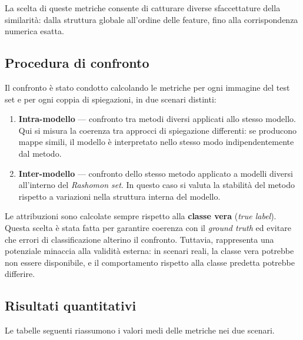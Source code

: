 \documentclass{article}
\begin{document}
La scelta di queste metriche consente di catturare diverse sfaccettature della
similarità: dalla struttura globale all’ordine delle feature, fino alla
corrispondenza numerica esatta.

\subsection{Procedura di confronto}
Il confronto è stato condotto calcolando le metriche per ogni immagine del test
set e per ogni coppia di spiegazioni, in due scenari distinti:

\begin{enumerate}
      \item \textbf{Intra-modello} — confronto tra metodi diversi applicati allo stesso modello. Qui si misura la coerenza tra approcci di spiegazione differenti: se producono mappe simili, il modello è interpretato nello stesso modo indipendentemente dal metodo.
      \item \textbf{Inter-modello} — confronto dello stesso metodo applicato a modelli diversi all’interno del \emph{Rashomon set}. In questo caso si valuta la stabilità del metodo rispetto a variazioni nella struttura interna del modello.
\end{enumerate}

Le attribuzioni sono calcolate sempre rispetto alla \textbf{classe vera}
(\textit{true label}). Questa scelta è stata fatta per garantire coerenza con
il \emph{ground truth} ed evitare che errori di classificazione alterino il
confronto. Tuttavia, rappresenta una potenziale minaccia alla validità esterna:
in scenari reali, la classe vera potrebbe non essere disponibile, e il
comportamento rispetto alla classe predetta potrebbe differire.

\subsection{Risultati quantitativi}
Le tabelle seguenti riassumono i valori medi delle metriche nei due scenari.
\end{document}
